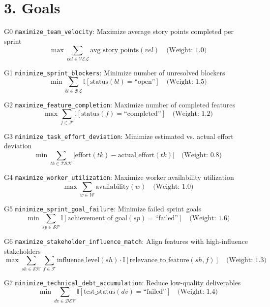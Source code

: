 \documentclass[12pt]{article}
\begin{document}
\section{3. Goals}
\item[G0] \texttt{maximize\_team\_velocity}: Maximize average story points completed per sprint
    \[
    \max \sum_{vel \in \mathcal{VEL}} \text{avg\_story\_points}(vel) \quad \text{(Weight: 1.0)}
    \]
    
    \item[G1] \texttt{minimize\_sprint\_blockers}: Minimize number of unresolved blockers
    \[
    \min \sum_{bl \in \mathcal{BL}} \mathbb{I}[\text{status}(bl) = \text{``open''}] \quad \text{(Weight: 1.5)}
    \]
    
    \item[G2] \texttt{maximize\_feature\_completion}: Maximize number of completed features
    \[
    \max \sum_{f \in \mathcal{F}} \mathbb{I}[\text{status}(f) = \text{``completed''}] \quad \text{(Weight: 1.2)}
    \]
    
    \item[G3] \texttt{minimize\_task\_effort\_deviation}: Minimize estimated vs. actual effort deviation
    \[
    \min \sum_{tk \in \mathcal{TSK}} \left| \text{effort}(tk) - \text{actual\_effort}(tk) \right| \quad \text{(Weight: 0.8)}
    \]
    
    \item[G4] \texttt{maximize\_worker\_utilization}: Maximize worker availability utilization
    \[
    \max \sum_{w \in \mathcal{W}} \text{availability}(w) \quad \text{(Weight: 1.0)}
    \]
    
    \item[G5] \texttt{minimize\_sprint\_goal\_failure}: Minimize failed sprint goals
    \[
    \min \sum_{sp \in \mathcal{SP}} \mathbb{I}[\text{achievement\_of\_goal}(sp) = \text{``failed''}] \quad \text{(Weight: 1.6)}
    \]
    
    \item[G6] \texttt{maximize\_stakeholder\_influence\_match}: Align features with high-influence stakeholders
    \[
    \max \sum_{sh \in \mathcal{SH}} \sum_{f \in \mathcal{F}} \text{influence\_level}(sh) \cdot \mathbb{I}[\text{relevance\_to\_feature}(sh,f)] \quad \text{(Weight: 1.3)}
    \]
    
    \item[G7] \texttt{minimize\_technical\_debt\_accumulation}: Reduce low-quality deliverables
    \[
    \min \sum_{dv \in \mathcal{DEV}} \mathbb{I}[\text{test\_status}(dv) = \text{``failed''}] \quad \text{(Weight: 1.4)}
    \]
    
\end{document}
